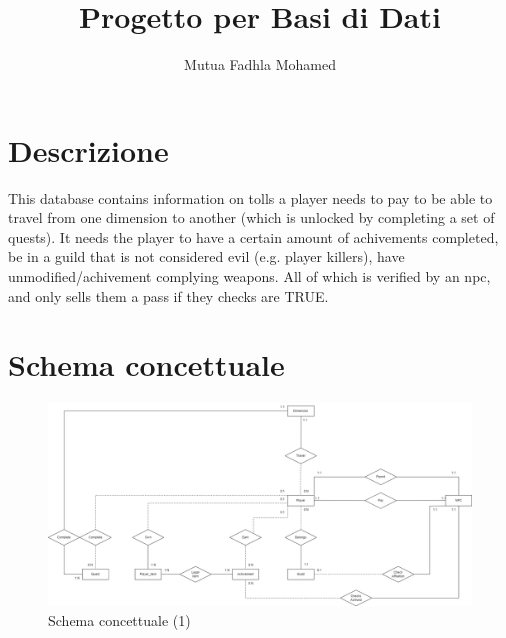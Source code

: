 \documentclass{article}
\title{Progetto per Basi di Dati}
\author{Mutua Fadhla Mohamed}
\begin{document}
\maketitle
\tableofcontents
\section{Descrizione}
This database contains information on tolls a player needs to pay to be able to travel from one dimension to another (which is unlocked by  completing a set of quests). It needs the player to have a certain amount of achivements completed, be in a guild that is not considered evil (e.g. player killers), have unmodified/achivement complying weapons. All of which is verified by an npc, and only sells them a pass if they checks are TRUE.
\section{Schema concettuale}

\begin{figure}[h!]
    \centering
    \includegraphics[width=1.2\textwidth]{schema_concetuale.png} %
    \caption{Schema concettuale (1)}
    \label{fig:Schema Concettuale}
\end{figure}
\end{document}
